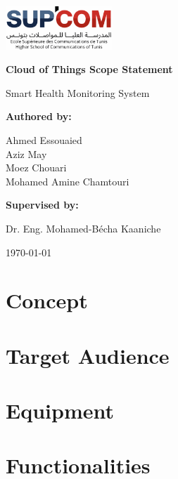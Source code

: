\documentclass[12pt,a4paper]{report}
\begin{document}
\begin{titlepage}
    \centering
    
    \includegraphics[width=0.3\textwidth]{assets/supcom-logo.png}\par\vspace{1cm}
    
    {\Huge \textbf{Cloud of Things Scope Statement}\par}
    \vspace{0.5cm}
    {\Large Smart Health Monitoring System\par}
    
    \vfill
    
    {\large \textbf{Authored by:}\par}
    \vspace{0.3cm}
    Ahmed Essouaied \\ 
    Aziz May \\ 
    Moez Chouari \\ 
    Mohamed Amine Chamtouri \par
    
    \vspace{1cm}
    
    {\large \textbf{Supervised by:}\par}
    \vspace{0.3cm}
    Dr. Eng. Mohamed-Bécha Kaaniche \par
    
    \vfill
    
    {\large \today\par}
\end{titlepage}

\tableofcontents
\newpage

\chapter{Concept}


\chapter{Target Audience}


\chapter{Equipment}


\chapter{Functionalities}

\end{document}
